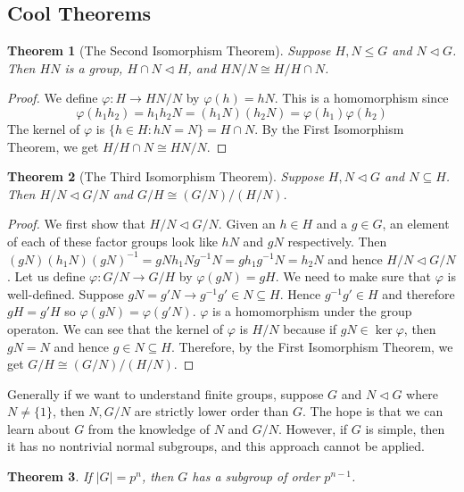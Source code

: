 \documentclass{article}
\newtheorem{theorem}{Theorem}[section]
\theoremstyle{definition}
\begin{document}
\subsection{Cool Theorems}
\begin{theorem}[The Second Isomorphism Theorem]
    Suppose $H,N \leq G$ and $N \lhd G$. Then $HN$ is a group, $H\cap N \lhd H$, and $HN/N \cong H/H\cap N$.
\end{theorem}
\begin{proof}
    We define $\varphi:H \to HN/N$ by $\varphi(h) = hN$. This is a homomorphism since 
    \begin{equation*}
        \varphi(h_1h_2) = h_1h_2N = (h_1N)(h_2N) = \varphi(h_1)\varphi(h_2)
    \end{equation*}
    The kernel of $\varphi$ is $\{h \in H : hN = N\} = H \cap N$. By the First Isomorphism Theorem, we get $H/H\cap N \cong HN/N$.
\end{proof}
\begin{theorem}[The Third Isomorphism Theorem]
    Suppose $H,N \lhd G$ and $N \subseteq H$. Then $H/N \lhd G/N$ and $G/H \cong (G/N)/(H/N)$.
\end{theorem}
\begin{proof}
    We first show that $H/N \lhd G/N$. Given an $h\in H$ and a $g \in G$, an element of each of these factor groups look like $hN$ and $gN$ respectively. Then $(gN)(h_1N)(gN)^{-1} = gNh_1Ng^{-1}N = gh_1g^{-1}N = h_2N$ and hence $H/N \lhd G/N$. Let us define $\varphi: G/N \to  G/H$ by $\varphi(gN) = gH$. We need to make sure that $\varphi$ is well-defined. Suppose $gN = g'N \to g^{-1}g' \in N \subseteq H$. Hence $g^{-1}g' \in H$ and therefore $gH = g'H$ so $\varphi(gN) = \varphi(g'N)$. $\varphi$ is a homomorphism under the group operaton. We can see that the kernel of $\varphi$ is $H/N$ because if $gN \in \ker \varphi$, then $gN=N$ and hence $g\in N\subseteq H$. Therefore, by the First Isomorphism Theorem, we get $G/H \cong (G/N)/(H/N)$.
\end{proof}
Generally if we want to understand finite groups, suppose $G$ and $N\lhd G$ where $N\neq \{1\}$, then $N,G/N$ are strictly lower order than $G$. The hope is that we can learn about $G$ from the knowledge of $N$ and $G/N$. However, if $G$ is simple, then it has no nontrivial normal subgroups, and this approach cannot be applied. 
\begin{theorem}
    If $|G| = p^n$, then $G$ has a subgroup of order $p^{n-1}$.
\end{theorem}
\end{document}
